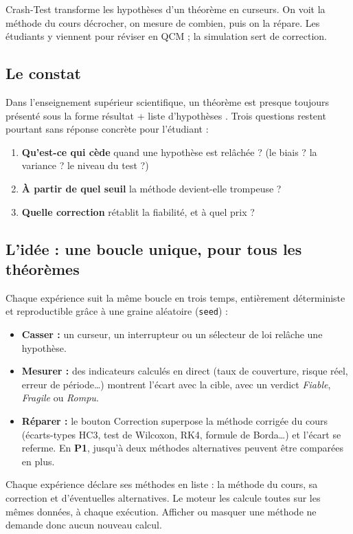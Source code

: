 \documentclass[11pt,a4paper]{article}
\newcommand{\pone}{\colorbox{ctMethod!18}{\footnotesize\textbf{P1}}}
\begin{document}
\begin{enbref}
Crash-Test transforme les hypothèses d'un théorème en curseurs. On voit la méthode du cours décrocher, on mesure de combien, puis on la répare. Les étudiants y viennent pour réviser en QCM ; la simulation sert de correction.
\end{enbref}

\subsection{Le constat}
Dans l'enseignement supérieur scientifique, un théorème est presque toujours présenté sous la forme \og résultat + liste d'hypothèses \fg. Trois questions restent pourtant sans réponse concrète pour l'étudiant :
\begin{enumerate}[leftmargin=*, nosep]
  \item \textbf{Qu'est-ce qui cède} quand une hypothèse est relâchée ? (le biais ? la variance ? le niveau du test ?)
  \item \textbf{À partir de quel seuil} la méthode devient-elle trompeuse ?
  \item \textbf{Quelle correction} rétablit la fiabilité, et à quel prix ?
\end{enumerate}

\subsection{L'idée : une boucle unique, pour tous les théorèmes}
Chaque expérience suit la même boucle en trois temps, entièrement déterministe et reproductible grâce à une graine aléatoire (\texttt{seed}) :
\begin{itemize}[leftmargin=*, nosep]
  \item \textbf{\color{ctBroken}Casser :} un curseur, un interrupteur ou un sélecteur de loi relâche une hypothèse.
  \item \textbf{\color{ctMethod}Mesurer :} des indicateurs calculés en direct (taux de couverture, risque réel, erreur de période\dots) montrent l'écart avec la cible, avec un verdict \emph{Fiable}, \emph{Fragile} ou \emph{Rompu}.
  \item \textbf{\color{ctCorrection}Réparer :} le bouton Correction superpose la méthode corrigée du cours (écarts-types HC3, test de Wilcoxon, RK4, formule de Borda\dots) et l'écart se referme. En \pone{}, jusqu'à deux méthodes alternatives peuvent être comparées en plus.
\end{itemize}
Chaque expérience déclare ses méthodes en liste : la méthode du cours, sa correction et d'éventuelles alternatives. Le moteur les calcule toutes sur les mêmes données, à chaque exécution. Afficher ou masquer une méthode ne demande donc aucun nouveau calcul.
\end{document}
